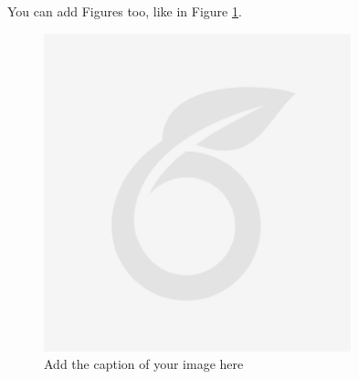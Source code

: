 \vspace{0.1 in}
\noindent
You can add Figures too, like in Figure \ref{fig:imagelabel}. 

\begin{figure}[H] %
    \centering
    \includegraphics[width=3.5in]{Figures/LitRev/image.png}
    \caption{Add the caption of your image here}
    \label{fig:imagelabel}
\end{figure}
